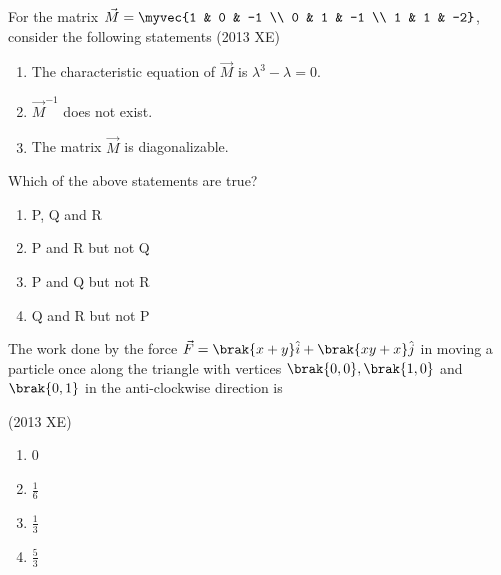\item For the matrix $\vec{M} = \myvec{1 & 0 & -1 \\ 0 & 1 & -1 \\ 1 & 1 & -2}$, consider the following statements \hfill(2013 XE)
	\begin{enumerate}[label=(\Alph*), start=16]
    \item The characteristic equation of $\vec{M}$ is $\lambda^{3} - \lambda = 0$.
    \item $\vec{M}^{-1}$ does not exist.
    \item The matrix $\vec{M}$ is diagonalizable.
\end{enumerate}
Which of the above statements are true?
\begin{multicols}{2}
\begin{enumerate}
    \item P, Q and R
    \item P and R but not Q
    \item P and Q but not R
    \item Q and R but not P
\end{enumerate}
\end{multicols}
\item The work done by the force
$
\vec{F} = \brak{x + y} \hat{i} + \brak{xy + x} \hat{j}
$
in moving a particle once along the triangle with vertices $\brak{0,0}, \brak{1,0}$ and $\brak{0,1}$ in the anti-clockwise direction is  

\hfill(2013 XE)

\begin{multicols}{4}
\begin{enumerate}
\item 0
\item $\frac{1}{6}$
\item $\frac{1}{3}$
\item $\frac{5}{3}$
\end{enumerate}
\end{multicols}

